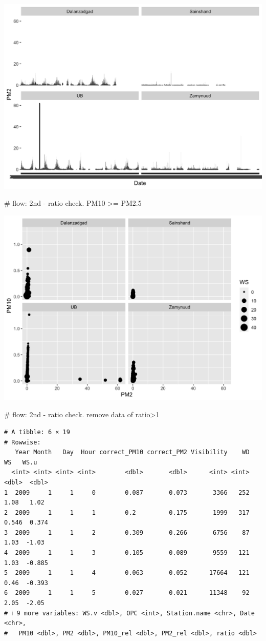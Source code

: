 \documentclass[
]{agujournal2019}
\begin{document}
\includegraphics{index_files/figure-latex/notebooks-01_datawork-cell-9-output-3.png}

\#\textbar{} flow: 2nd - ratio check. PM10 \textgreater= PM2.5

\includegraphics{index_files/figure-latex/notebooks-01_datawork-cell-10-output-2.png}

\#\textbar{} flow: 2nd - ratio check. remove data of ratio\textgreater1

\begin{verbatim}
# A tibble: 6 × 19
# Rowwise: 
   Year Month   Day  Hour correct_PM10 correct_PM2 Visibility    WD    WS   WS.u
  <int> <int> <int> <int>        <dbl>       <dbl>      <int> <int> <dbl>  <dbl>
1  2009     1     1     0        0.087       0.073       3366   252 1.08   1.02 
2  2009     1     1     1        0.2         0.175       1999   317 0.546  0.374
3  2009     1     1     2        0.309       0.266       6756    87 1.03  -1.03 
4  2009     1     1     3        0.105       0.089       9559   121 1.03  -0.885
5  2009     1     1     4        0.063       0.052      17664   121 0.46  -0.393
6  2009     1     1     5        0.027       0.021      11348    92 2.05  -2.05 
# ℹ 9 more variables: WS.v <dbl>, OPC <int>, Station.name <chr>, Date <chr>,
#   PM10 <dbl>, PM2 <dbl>, PM10_rel <dbl>, PM2_rel <dbl>, ratio <dbl>
\end{verbatim}
\end{document}
